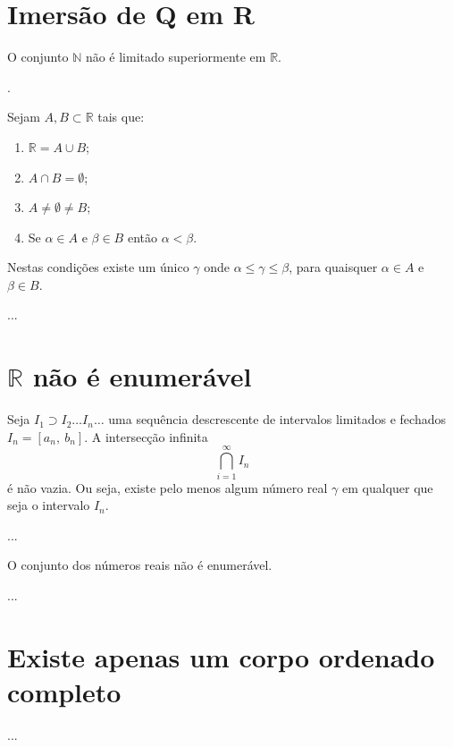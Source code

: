 \documentclass[../main.tex]{subfiles}
\begin{document}
\section{Imersão de Q em R}
\begin{teo}\label{reais-teo-ilimitadoSuperiormente}
    O conjunto $\mathbb{N}$ não é limitado superiormente em $\mathbb{R}$.
\end{teo}
\begin{dem}
    .
\end{dem}
\begin{teo}\label{reais-teo-completude}
    Sejam $A,B \subset \mathbb{R}$ tais que:
    \begin{enumerate}[label=(\roman*)]
        \item $\mathbb{R} = A \cup B$;
        \item $A \cap B = \emptyset$;
        \item $A \neq \emptyset \neq B$;
        \item Se $\alpha \in A$ e $\beta \in B$ então $\alpha < \beta$.
    \end{enumerate}
    Nestas condições existe um único $\gamma$ onde $\alpha \leq \gamma \leq \beta$, para quaisquer $\alpha \in A$ e $\beta \in B$.
\end{teo}
\begin{dem}
    ...
\end{dem}


\section{$\mathbb{R}$ não é enumerável}
\begin{teo}\label{reais-teo-intervalosEncaixados}
    Seja $I_1 \supset I_2 \dots I_n \dots$ uma sequência descrescente de intervalos limitados e fechados $I_n = [a_n,\ b_n]$. A intersecção infinita 
    \[ \bigcap\limits^\infty_{i=1} I_n\]
    é não vazia. Ou seja, existe pelo menos algum número real $\gamma$ em qualquer que seja o intervalo $I_n$.
\end{teo}
\begin{dem}
     ...
\end{dem}
\begin{teo}\label{reais-teo-naoEnumeravel}
    O conjunto dos números reais não é enumerável.
\end{teo}
\begin{dem}
    
\end{dem}
 ...
\section{Existe apenas um corpo ordenado completo}
 ...
\end{document}
